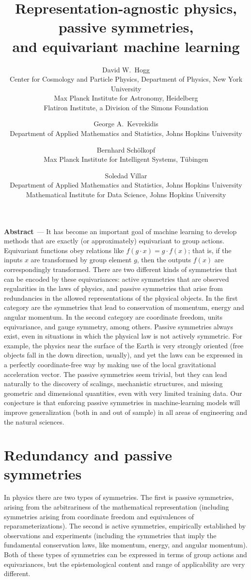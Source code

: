 \documentclass[11pt]{article}
\title{\bfseries%
Representation-agnostic physics,\\ passive symmetries,\\ and equivariant machine learning}
\author{%
  David W.~Hogg\\
{\footnotesize Center for Cosmology and Particle Physics, Department of Physics, New York University}\\[-1ex]
{\footnotesize Max Planck Institute for Astronomy, Heidelberg}\\[-1ex]
{\footnotesize Flatiron Institute, a Division of the Simons Foundation}
  \and
  George A.~Kevrekidis\\
{\footnotesize Department of Applied Mathematics and Statistics, Johns Hopkins University}
  \and
  Bernhard Sch\"olkopf\\
{\footnotesize Max Planck Institute for Intelligent Systems, T\"ubingen}
  \and
  Soledad Villar\\
{\footnotesize Department of Applied Mathematics and Statistics, Johns Hopkins University}\\[-1ex]
{\footnotesize Mathematical Institute for Data Science, Johns Hopkins University}
}
\renewcommand{\paragraph}[1]{\medskip\par\noindent\textbf{#1}~---}
\begin{document}
\maketitle

\paragraph{Abstract} 
It has become an important goal of machine learning to develop methods that are exactly (or approximately) equivariant to group actions.
Equivariant functions obey relations like $f(g\cdot x) = g\cdot f(x)$; that is, if the inputs $x$ are transformed by group element $g$, then the outputs $f(x)$ are correspondingly transformed.
There are two different kinds of symmetries that can be encoded by these equivariances: active symmetries that are observed regularities in the laws of physics, and passive symmetries that arise from redundancies in the allowed representations of the physical objects. 
In the first category are the symmetries that lead to conservation of momentum, energy and angular momentum. In the second category are coordinate freedom, units equivariance, and gauge symmetry, among others.  
Passive symmetries always exist, even in situations in which the physical law is not actively symmetric.
For example, the physics near the surface of the Earth is very strongly oriented (free objects fall in the down direction, usually), and yet the laws can be expressed in a perfectly coordinate-free way by making use of the local gravitational acceleration vector.
The passive symmetries seem trivial, but they can lead naturally to the discovery of scalings, mechanistic structures, and missing geometric and dimensional quantities, even with very limited training data.
Our conjecture is that enforcing passive symmetries in machine-learning models will improve generalization (both in and out of sample) in all areas of engineering and the natural sciences.

\section{Redundancy and passive symmetries}

In physics there are two types of symmetries. 
The first is passive symmetries, arising from the arbitrariness of the mathematical representation (including symmetries arising from coordinate freedom and equivalences of reparameterizations).
The second is active symmetries, empirically established by observations and experiments (including the symmetries that imply the fundamental conservation laws, like momentum, energy, and angular momentum). Both of these types of symmetries can be expressed in terms of group actions and equivariances, but the epistemological content and range of applicability are very different. 
\end{document}
